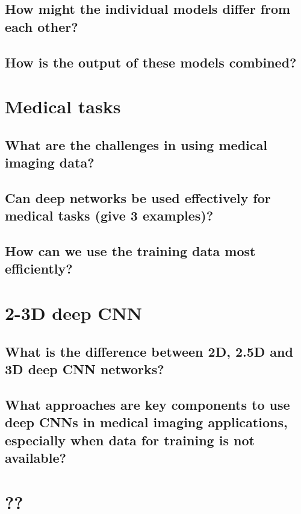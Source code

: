 \subsection{How might the individual models differ from each other?}

\subsection{How is the output of these models combined?}

\section{Medical tasks}

\subsection{What are the challenges in using medical imaging data?}

\subsection{Can deep networks be used effectively for medical tasks (give 3 examples)?}

\subsection{How can we use the training data most efficiently?}

\section{2-3D deep CNN}

\subsection{What is the difference between 2D, 2.5D and 3D deep CNN networks?}

\subsection{What approaches are key components to use deep CNNs in medical imaging applications, especially when data for training is not available?}

\section{??}

